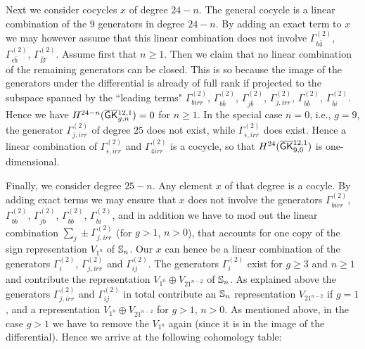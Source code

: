 Next we consider cocycles $x$ of degree $24-n$.
The general cocycle is a linear combination of the $9$ generators in degree $24-n$. By adding an exact term to $x$ we may however assume that this linear combination does not involve $\Gamma_{b\bar 4}^{(2)}$, $\Gamma_{\epsilon \bar b}^{(2)}$, $\Gamma_{\bar B'}^{(2)}$.
Assume first that $n\geq 1$. Then we claim that no linear combination of the remaining generators can be closed. This is so because the image of the generators under the differential is already of full rank if projected to the subspace spanned by the ``leading terms" $\Gamma_{birr}^{(2)}$, $\Gamma_{b\bar b}^{(2)}$,
$\Gamma_{j\bar b}^{(2)}$,
$\Gamma_{j,irr}^{(2)}$,
$\Gamma_{\bar b\bar b}^{(2)}$,
$\Gamma_{\bar bi}^{(2)}$.
Hence we have $H^{24-n}(\myB_{g,n})=0$ for $n\geq 1$.
In the special case $n=0$, i.e., $g=9$, the generator $\Gamma_{j,irr}^{(2)}$ of degree $25$ does not exist, while $\Gamma_{\epsilon,irr}^{(2)}$ does exist.
Hence a linear combination of $\Gamma_{\epsilon,irr}^{(2)}$ and $\Gamma_{4irr}^{(2)}$ is a cocycle, so that $H^{24}(\myB_{9,0})$ is one-dimensional.

Finally, we consider degree $25-n$. 
Any element $x$ of that degree is a cocyle. 
By adding exact terms we may ensure that $x$ does not involve the generators 
$\Gamma_{birr}^{(2)}$,
$\Gamma_{b\bar b}^{(2)}$,
$\Gamma_{j\bar b}^{(2)}$,
$\Gamma_{\bar b\bar b}^{(2)}$,
$\Gamma_{\bar bi}^{(2)}$,
and in addition we have to mod out the linear combination $\sum_j\pm \Gamma_{j,irr}^{(2)}$ (for $g>1$, $n>0$), that accounts for one copy of the sign representation $V_{1^n}$ of $\ss_n$.
Our $x$ can hence be a linear combination of the generators $\Gamma_i^{(2)}$,
$\Gamma_{j,irr}^{(2)}$ and $\Gamma_{ij}^{(2)}$.
The generators $\Gamma_i^{(2)}$ exist for $g\geq 3$ and $n\geq 1$ and contribute the representation $V_{1^n} \oplus V_{21^{n-2}}$ of $\bbS_n$.
As explained above the generators $\Gamma_{j,irr}^{(2)}$ and $\Gamma_{ij}^{(2)}$ in total contribute an $\ss_n$ representation $V_{21^{n-2}}$ if $g=1$, and a representation $V_{1^n}\oplus V_{21^{n-2}}$ for $g>1$, $n>0$. As mentioned above, in the case $g>1$ we have to remove the $V_{1^n}$ again (since it is in the image of the differential).
Hence we arrive at the following cohomology table:

